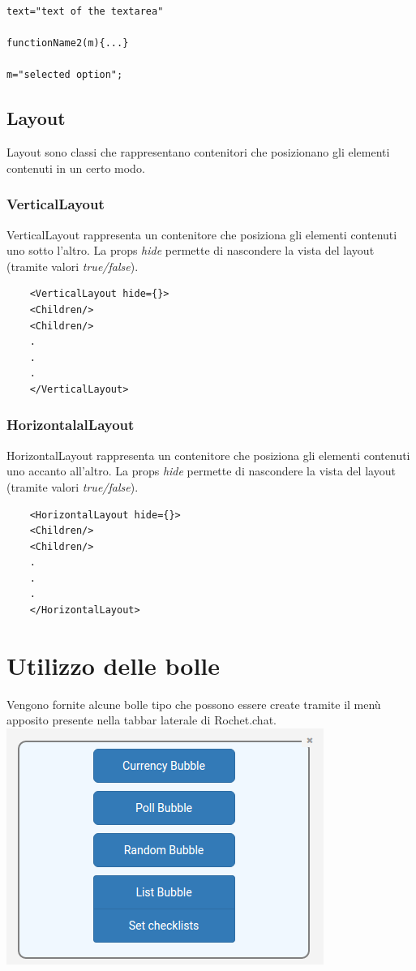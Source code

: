 \begin{flushleft}
\begin{verbatim}
text="text of the textarea"

functionName2(m){...}

m="selected option";
\end{verbatim}
\end{flushleft}

\subsection{Layout}
Layout sono classi che rappresentano contenitori che posizionano gli elementi contenuti in un certo modo.
\begin{flushleft}
\subsubsection{VerticalLayout}
VerticalLayout rappresenta un contenitore che posiziona gli elementi contenuti uno sotto l'altro. La props \textit{hide} permette di nascondere la vista del layout (tramite valori \textit{true/false}).
\begin{verbatim}
	<VerticalLayout hide={}>
	<Children/>
	<Children/>
	.
	.
	.
	</VerticalLayout>
\end{verbatim}


\subsubsection{HorizontalalLayout}
HorizontalLayout rappresenta un contenitore che posiziona gli elementi contenuti uno accanto all'altro. La props \textit{hide} permette di nascondere la vista del layout (tramite valori \textit{true/false}).

\begin{verbatim}
	<HorizontalLayout hide={}>
	<Children/>
	<Children/>
	.
	.
	.
	</HorizontalLayout>
\end{verbatim}
\end{flushleft}

\section{Utilizzo delle bolle}
Vengono fornite alcune bolle tipo che possono essere create tramite il menù apposito presente nella tabbar laterale di Rochet.chat.\\

\includegraphics[scale=0.75]{img/menu.png}
\newpage
